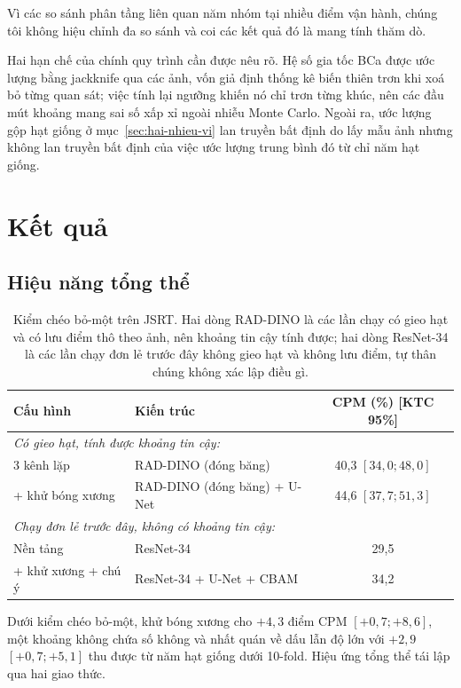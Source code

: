 \documentclass[12pt,a4paper]{article}
\begin{document}
Vì các so sánh phân tầng liên quan năm nhóm tại nhiều điểm vận hành, chúng tôi
không hiệu chỉnh đa so sánh và coi các kết quả đó là mang tính thăm dò.

Hai hạn chế của chính quy trình cần được nêu rõ. Hệ số gia tốc BCa được ước lượng
bằng jackknife qua các ảnh, vốn giả định thống kê biến thiên trơn khi xoá bỏ từng
quan sát; việc tính lại ngưỡng khiến nó chỉ trơn từng khúc, nên các đầu mút khoảng
mang sai số xấp xỉ ngoài nhiễu Monte Carlo. Ngoài ra, ước lượng gộp hạt giống ở
mục~\ref{sec:hai-nhieu-vi} lan truyền bất định do lấy mẫu ảnh nhưng không lan
truyền bất định của việc ước lượng trung bình đó từ chỉ năm hạt giống.

\section{Kết quả}

\subsection{Hiệu năng tổng thể}

\begin{table}[t]
\centering
\caption{Kiểm chéo bỏ-một trên JSRT. Hai dòng RAD-DINO là các lần chạy có gieo
hạt và có lưu điểm thô theo ảnh, nên khoảng tin cậy tính được; hai dòng ResNet-34
là các lần chạy đơn lẻ trước đây không gieo hạt và không lưu điểm, tự thân chúng
không xác lập điều gì.}
\label{tab:loocv-vi}
\begin{tabular}{llc}
\toprule
Cấu hình & Kiến trúc & CPM (\%) [KTC 95\%] \\
\midrule
\multicolumn{3}{l}{\emph{Có gieo hạt, tính được khoảng tin cậy:}} \\
3 kênh lặp        & RAD-DINO (đóng băng)          & 40,3 $[34{,}0; 48{,}0]$ \\
+ khử bóng xương  & RAD-DINO (đóng băng) + U-Net  & 44,6 $[37{,}7; 51{,}3]$ \\
\midrule
\multicolumn{3}{l}{\emph{Chạy đơn lẻ trước đây, không có khoảng tin cậy:}} \\
Nền tảng                  & ResNet-34                & 29,5 \\
+ khử xương + chú ý       & ResNet-34 + U-Net + CBAM & 34,2 \\
\bottomrule
\end{tabular}
\end{table}

Dưới kiểm chéo bỏ-một, khử bóng xương cho $+4{,}3$ điểm CPM $[+0{,}7; +8{,}6]$,
một khoảng không chứa số không và nhất quán về dấu lẫn độ lớn với $+2{,}9$
$[+0{,}7; +5{,}1]$ thu được từ năm hạt giống dưới 10-fold. Hiệu ứng tổng thể tái
lập qua hai giao thức.
\end{document}
